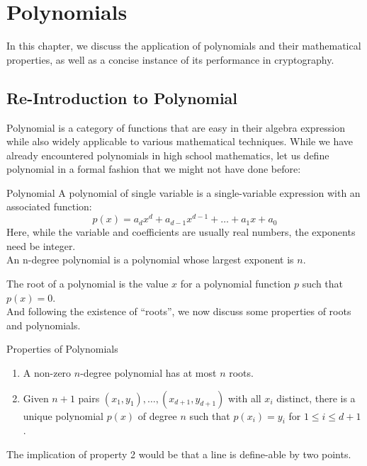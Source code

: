 \chapter{Polynomials}
In this chapter, we discuss the application of polynomials and their mathematical properties, as well as a concise instance of its performance in cryptography.

\section{Re-Introduction to Polynomial}
Polynomial is a category of functions that are easy in their algebra expression while also widely applicable to various mathematical techniques. While we have already encountered polynomials in high school mathematics, let us define polynomial in a formal fashion that we might not have done before:
\begin{ln-define}{Polynomial}{}
    A polynomial of single variable is a single-variable expression with an associated function:
    \[p(x) = a_d x^d + a_{d - 1} x^{d - 1} + \dots + a_1 x + a_0\]
    Here, while the variable and coefficients are usually real numbers, the exponents need be integer. \\
    An n-degree polynomial is a polynomial whose largest exponent is $n$.
\end{ln-define}
The root of a polynomial is the value $x$ for a polynomial function $p$ such that $p(x) = 0$. \\
And following the existence of ``roots'', we now discuss some properties of roots and polynomials.
\begin{ln-symbol}{Properties of Polynomials}{}
    \begin{enumerate}
        \item A non-zero $n$-degree polynomial has at most $n$ roots.
        \item Given $n + 1$ pairs $(x_1, y_1), \dots, (x_{d + 1}, y_{d + 1})$ with all $x_i$ distinct, there is a unique polynomial $p(x)$ of degree $n$ such that $p(x_i) = y_i$ for $1 \leq i \leq d + 1$.
    \end{enumerate}
\end{ln-symbol}
The implication of property 2 would be that a line is define-able by two points.

